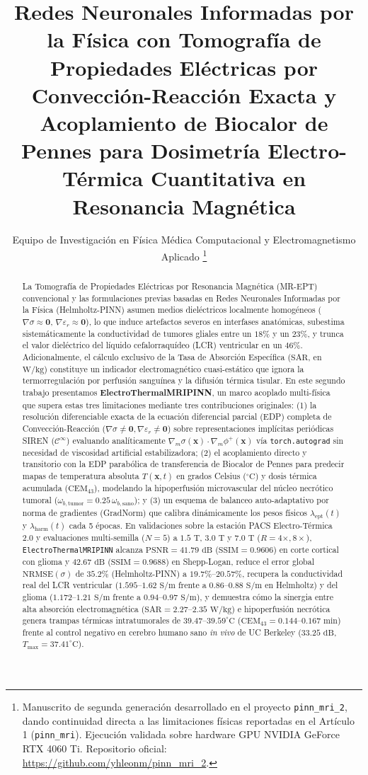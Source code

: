 \documentclass[10pt,journal,compsoc]{IEEEtran}
\title{Redes Neuronales Informadas por la Física con Tomografía de Propiedades Eléctricas por Convección-Reacción Exacta y Acoplamiento de Biocalor de Pennes para Dosimetría Electro-Térmica Cuantitativa en Resonancia Magnética}
\author{Equipo de Investigación en Física Médica Computacional y Electromagnetismo Aplicado%
\thanks{Manuscrito de segunda generación desarrollado en el proyecto \texttt{pinn\_mri\_2}, dando continuidad directa a las limitaciones físicas reportadas en el Artículo 1 (\texttt{pinn\_mri}). Ejecución validada sobre hardware GPU NVIDIA GeForce RTX 4060 Ti. Repositorio oficial: \url{https://github.com/yhleonm/pinn_mri_2}.}}
\begin{document}
\maketitle

\begin{abstract}
La Tomografía de Propiedades Eléctricas por Resonancia Magnética (MR-EPT) convencional y las formulaciones previas basadas en Redes Neuronales Informadas por la Física (Helmholtz-PINN) asumen medios dieléctricos localmente homogéneos ($\nabla\sigma \approx \mathbf{0}$, $\nabla\varepsilon_r \approx \mathbf{0}$), lo que induce artefactos severos en interfases anatómicas, subestima sistemáticamente la conductividad de tumores gliales entre un $18\%$ y un $23\%$, y trunca el valor dieléctrico del líquido cefalorraquídeo (LCR) ventricular en un $46\%$. Adicionalmente, el cálculo exclusivo de la Tasa de Absorción Específica ($\text{SAR}$, en $\text{W/kg}$) constituye un indicador electromagnético cuasi-estático que ignora la termorregulación por perfusión sanguínea y la difusión térmica tisular. En este segundo trabajo presentamos \textbf{ElectroThermalMRIPINN}, un marco acoplado multi-física que supera estas tres limitaciones mediante tres contribuciones originales: (1) la resolución diferenciable exacta de la ecuación diferencial parcial (EDP) completa de Convección-Reacción ($\nabla\sigma \neq \mathbf{0}, \nabla\varepsilon_r \neq \mathbf{0}$) sobre representaciones implícitas periódicas SIREN ($\mathcal{C}^\infty$) evaluando analíticamente $\nabla_m\sigma(\mathbf{x})\cdot\nabla_m\phi^+(\mathbf{x})$ vía \texttt{torch.autograd} sin necesidad de viscosidad artificial estabilizadora; (2) el acoplamiento directo y transitorio con la EDP parabólica de transferencia de Biocalor de Pennes para predecir mapas de temperatura absoluta $T(\mathbf{x},t)$ en grados Celsius ($^\circ\text{C}$) y dosis térmica acumulada ($\text{CEM}_{43}$), modelando la hipoperfusión microvascular del núcleo necrótico tumoral ($\omega_{b,\text{tumor}} = 0.25\,\omega_{b,\text{sano}}$); y (3) un esquema de balanceo auto-adaptativo por norma de gradientes (GradNorm) que calibra dinámicamente los pesos físicos $\lambda_{\text{ept}}(t)$ y $\lambda_{\text{harm}}(t)$ cada 5 épocas. En validaciones sobre la estación PACS Electro-Térmica 2.0 y evaluaciones multi-semilla ($N=5$) a $1.5\text{ T}$, $3.0\text{ T}$ y $7.0\text{ T}$ ($R=4\times, 8\times$), \texttt{ElectroThermalMRIPINN} alcanza $\text{PSNR} = 41.79\text{ dB}$ ($\text{SSIM} = 0.9606$) en corte cortical con glioma y $42.67\text{ dB}$ ($\text{SSIM} = 0.9688$) en Shepp-Logan, reduce el error global $\text{NRMSE}(\sigma)$ de $35.2\%$ (Helmholtz-PINN) a $19.7\%\text{--}20.57\%$, recupera la conductividad real del LCR ventricular ($1.595\text{--}1.62\text{ S/m}$ frente a $0.86\text{--}0.88\text{ S/m}$ en Helmholtz) y del glioma ($1.172\text{--}1.21\text{ S/m}$ frente a $0.94\text{--}0.97\text{ S/m}$), y demuestra cómo la sinergia entre alta absorción electromagnética ($\text{SAR} = 2.27\text{--}2.35\text{ W/kg}$) e hipoperfusión necrótica genera trampas térmicas intratumorales de $39.47\text{--}39.59^\circ\text{C}$ ($\text{CEM}_{43} = 0.144\text{--}0.167\text{ min}$) frente al control negativo en cerebro humano sano \textit{in vivo} de UC Berkeley ($33.25\text{ dB}$, $T_{\max} = 37.41^\circ\text{C}$).

\end{abstract}
\end{document}
